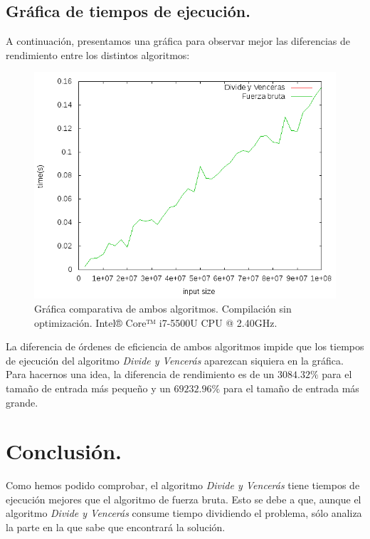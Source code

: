 \documentclass[11pt,a4paper]{article}
\begin{document}
		\subsection{Gráfica de tiempos de ejecución.}

			\par
			A continuación, presentamos una gráfica para observar mejor las diferencias de rendimiento entre los distintos algoritmos:

			\begin{figure}[h]

				\centering
				\includegraphics[width=1\textwidth]{comparativa.png}
				\caption{Gráfica comparativa de ambos algoritmos. Compilación sin optimización. Intel® Core™ i7-5500U CPU @ 2.40GHz.}

			\end{figure}

			\vspace{5mm}

			\par
			La diferencia de órdenes de eficiencia de ambos algoritmos impide que los tiempos de ejecución del algoritmo \textit{Divide y Vencerás} aparezcan siquiera en la gráfica. Para hacernos una idea, la diferencia de rendimiento es de un $3084.32\%$ para el tamaño de entrada más pequeño y un $69232.96\%$ para el tamaño de entrada más grande.

\newpage

	\section{Conclusión.}

		\par
		Como hemos podido comprobar, el algoritmo \textit{Divide y Vencerás} tiene tiempos de ejecución mejores que el algoritmo de fuerza bruta. Esto se debe a que, aunque el algoritmo \textit{Divide y Vencerás} consume tiempo dividiendo el problema, sólo analiza la parte en la que sabe que encontrará la solución.		
\end{document}
